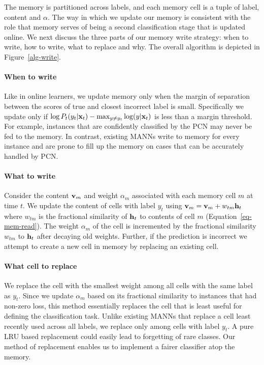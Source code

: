 \documentclass[letterpaper]{article} %
\newcommand{\vek}[1]{{\bf {#1}}}
\newcommand{\vx}{{\vek{x}}}
\newcommand{\vh}{{\vek{h}}}
\newcommand{\vM}{{\vek{v}}}
\def\shiv#1{\todo [color=orange]{Shiv: #1}}
\begin{document}
The memory is partitioned across labels, and each memory cell is a tuple of label, content and $\alpha$.  %
The way in which we update our memory is consistent with the role that memory serves of being a second classification stage that is updated online.  We next discuss the three parts of our memory write strategy: when to write, how to write, what to replace and why. The overall algorithm is depicted in Figure~\ref{alg-write}.
\paragraph{When to write}
Like in online learners, we update memory only when the margin of separation between the scores of true and closest incorrect label is small. Specifically we update only if $\log P_t(y_t|\vx_t) - \max_{y \ne y_t} \log (y | \vx_t)$ is less than a margin threshold.  For example, instances that are confidently classified by the PCN may never be fed to the memory.
In contrast,  existing MANNs write to memory for every instance and are prone to fill up the memory on cases that can be accurately handled by PCN.
\paragraph{What to write}
Consider the content $\vM_m$ and weight $\alpha_m$ associated with
each memory cell $m$ at time $t$.   We update the content of cells with label $y_t$ using $\vM_{m} = \vM_{m} + w_{tm}{\vh_t}$ where $w_{tm}$ is the fractional similarity of $\vh_t$ to contents of cell $m$ (Equation~\ref{eq-mem-read}). The weight $\alpha_m$ of the cell is incremented by the fractional similarity $w_{tm}$ to $\vh_t$ after decaying old weights.
Further, if the prediction is incorrect we attempt to create a new cell in memory  by replacing an existing cell.
\paragraph{What cell to replace} We replace the cell with the smallest weight among all cells with the same label as $y_t$. %
Since we update $\alpha_m$ based on its fractional similarity to instances that had non-zero loss, this method essentially replaces the cell that is least useful for defining the classification task.  Unlike existing MANNs that replace a cell least recently used across all labels, we replace only among cells with label $y_t$. A pure LRU based replacement could easily lead to forgetting of rare classes.  Our method of replacement enables us to implement a fairer classifier atop the memory.
\end{document}
